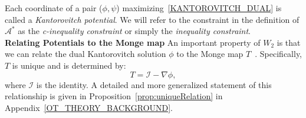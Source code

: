 \documentclass[runningheads]{llncs}
\newcommand{\id}{\mathcal{I}}
\begin{document}
Each coordinate of a pair ($\phi,\psi$) maximizing~\eqref{KANTOROVITCH_DUAL} is called a \textit{Kantorovitch potential}. We will refer to the constraint in the definition of $\mathcal{A}^*$ as the \emph{c-inequality constraint} or simply the \emph{inequality constraint}. \\


\noindent \textbf{Relating Potentials to the Monge map}
An important property of $W_2$ is that we can relate the dual Kantorovitch solution $\phi$ to the Monge map $T$~\citep{brenier1991polar}. Specifically, $T$ is unique and is determined by:
\begin{equation}
  T= \id- \nabla \phi,
\label{T_GRAD_PHI}
\end{equation}
where $\id$ is the identity. A detailed and more generalized statement of this relationship is given in Proposition~\eqref{prop:uniqueRelation} in Appendix~\ref{OT_THEORY_BACKGROUND}. \\
\end{document}
